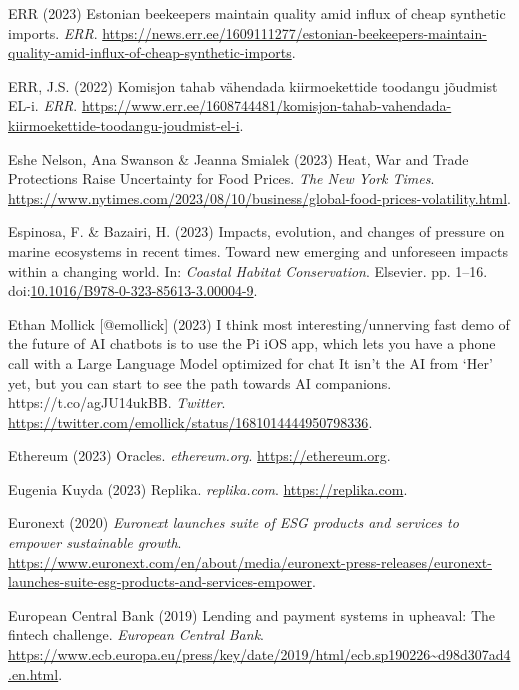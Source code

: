 \documentclass[
  letterpaper,
  DIV=11,
  numbers=noendperiod]{scrartcl}
\newlength{\cslhangindent}
\newenvironment{CSLReferences}[2] %
 {\begin{list}{}{%
  \setlength{\itemindent}{0pt}
  \setlength{\leftmargin}{0pt}
  \setlength{\parsep}{0pt}
  \ifodd #1
   \setlength{\leftmargin}{\cslhangindent}
   \setlength{\itemindent}{-1\cslhangindent}
  \fi
  \setlength{\itemsep}{#2\baselineskip}}}
 {\end{list}}
\begin{document}
\begin{CSLReferences}{0}{1}
ERR (2023) Estonian beekeepers maintain quality amid influx of cheap
synthetic imports. \emph{ERR}.
\url{https://news.err.ee/1609111277/estonian-beekeepers-maintain-quality-amid-influx-of-cheap-synthetic-imports}.

ERR, J.S. (2022) {Komisjon tahab v{ä}hendada kiirmoekettide toodangu
j{õ}udmist EL-i}. \emph{ERR}.
\url{https://www.err.ee/1608744481/komisjon-tahab-vahendada-kiirmoekettide-toodangu-joudmist-el-i}.

Eshe Nelson, Ana Swanson \& Jeanna Smialek (2023) Heat, {War} and {Trade
Protections Raise Uncertainty} for {Food Prices}. \emph{The New York
Times}.
\url{https://www.nytimes.com/2023/08/10/business/global-food-prices-volatility.html}.

Espinosa, F. \& Bazairi, H. (2023) Impacts, evolution, and changes of
pressure on marine ecosystems in recent times. {Toward} new emerging and
unforeseen impacts within a changing world. In: \emph{Coastal {Habitat
Conservation}}. Elsevier. pp. 1--16.
doi:\href{https://doi.org/10.1016/B978-0-323-85613-3.00004-9}{10.1016/B978-0-323-85613-3.00004-9}.

Ethan Mollick {[}@emollick{]} (2023) I think most interesting/unnerving
fast demo of the future of {AI} chatbots is to use the {Pi iOS} app,
which lets you have a phone call with a {Large Language Model} optimized
for chat {It} isn't the {AI} from {`{Her}'} yet, but you can start to
see the path towards {AI} companions. {https://t.co/agJU14ukBB}.
\emph{Twitter}.
\url{https://twitter.com/emollick/status/1681014444950798336}.

Ethereum (2023) Oracles. \emph{ethereum.org}.
\url{https://ethereum.org}.

Eugenia Kuyda (2023) Replika. \emph{replika.com}.
\url{https://replika.com}.

Euronext (2020) \emph{Euronext launches suite of {ESG} products and
services to empower sustainable growth}.
\url{https://www.euronext.com/en/about/media/euronext-press-releases/euronext-launches-suite-esg-products-and-services-empower}.

European Central Bank (2019) Lending and payment systems in upheaval:
The fintech challenge. \emph{European Central Bank}.
\url{https://www.ecb.europa.eu/press/key/date/2019/html/ecb.sp190226~d98d307ad4.en.html}.


\end{CSLReferences}
\end{document}
